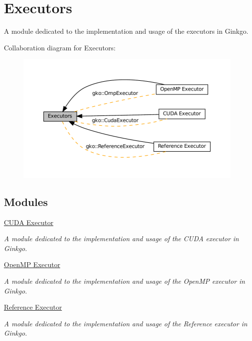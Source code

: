 \hypertarget{group__Executor}{}\section{Executors}
\label{group__Executor}


A module dedicated to the implementation and usage of the executors in Ginkgo.  


Collaboration diagram for Executors\+:
\nopagebreak
\begin{figure}[H]
\begin{center}
\leavevmode
\includegraphics[width=350pt]{group__Executor}
\end{center}
\end{figure}
\subsection*{Modules}
\begin{DoxyCompactItemize}
\item 
\hyperlink{group__exec__cuda}{C\+U\+D\+A Executor}
\begin{DoxyCompactList}\small\item\em A module dedicated to the implementation and usage of the C\+U\+DA executor in Ginkgo. \end{DoxyCompactList}\item 
\hyperlink{group__exec__omp}{Open\+M\+P Executor}
\begin{DoxyCompactList}\small\item\em A module dedicated to the implementation and usage of the Open\+MP executor in Ginkgo. \end{DoxyCompactList}\item 
\hyperlink{group__exec__ref}{Reference Executor}
\begin{DoxyCompactList}\small\item\em A module dedicated to the implementation and usage of the Reference executor in Ginkgo. \end{DoxyCompactList}\end{DoxyCompactItemize}
